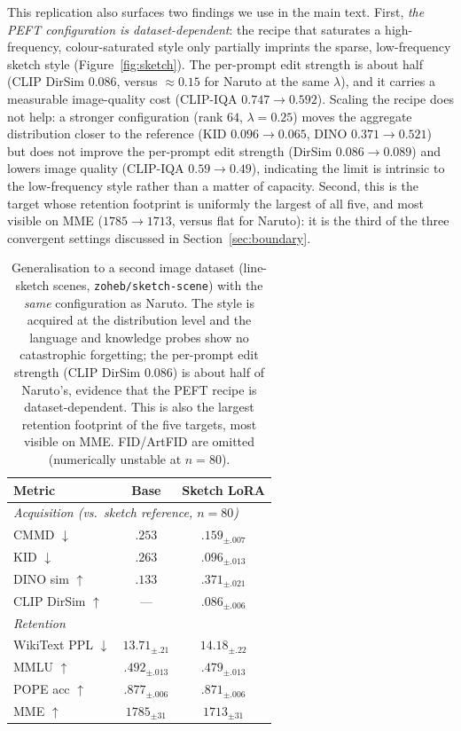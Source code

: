 This replication also surfaces two findings we use in the main text. First,
\emph{the PEFT configuration is dataset-dependent}: the recipe that saturates a
high-frequency, colour-saturated style only partially imprints the sparse,
low-frequency sketch style (Figure~\ref{fig:sketch}). The per-prompt edit
strength is about half (CLIP DirSim $0.086$, versus $\approx\!0.15$ for Naruto at
the same $\lambda$), and it carries a measurable image-quality cost (CLIP-IQA
$0.747\!\to\!0.592$). Scaling the recipe does not help: a stronger configuration
(rank $64$, $\lambda{=}0.25$) moves the aggregate distribution closer to the
reference (KID $0.096\!\to\!0.065$, DINO $0.371\!\to\!0.521$) but does not
improve the per-prompt edit strength (DirSim $0.086\!\to\!0.089$) and lowers
image quality (CLIP-IQA $0.59\!\to\!0.49$), indicating the limit is intrinsic to
the low-frequency style rather than a matter of capacity. Second, this is the
target whose retention footprint is uniformly the largest of all five, and most
visible on MME ($1785\!\to\!1713$, versus flat for Naruto): it is the third of
the three convergent settings discussed in Section~\ref{sec:boundary}.

\begin{table}[t]
\centering\small
\setlength{\tabcolsep}{8pt}
\begin{tabular}{lcc}
\toprule
Metric & Base & Sketch LoRA \\
\midrule
\multicolumn{3}{l}{\textit{Acquisition (vs.\ sketch reference, $n{=}80$)}}\\
CMMD $\downarrow$      & $.253$ & $\mathbf{.159}_{\pm.007}$ \\
KID $\downarrow$       & $.263$ & $\mathbf{.096}_{\pm.013}$ \\
DINO sim $\uparrow$    & $.133$ & $\mathbf{.371}_{\pm.021}$ \\
CLIP DirSim $\uparrow$ & ---    & $.086_{\pm.006}$ \\
\midrule
\multicolumn{3}{l}{\textit{Retention}}\\
WikiText PPL $\downarrow$ & $13.71_{\pm.21}$ & $14.18_{\pm.22}$ \\
MMLU $\uparrow$           & $.492_{\pm.013}$ & $.479_{\pm.013}$ \\
POPE acc $\uparrow$       & $.877_{\pm.006}$ & $.871_{\pm.006}$ \\
MME $\uparrow$            & $1785_{\pm31}$   & $1713_{\pm31}$ \\
\bottomrule
\end{tabular}
\caption{Generalisation to a second image dataset (line-sketch scenes,
\texttt{zoheb/sketch-scene}) with the \emph{same} configuration as Naruto. The
style is acquired at the distribution level and the language and knowledge probes
show no catastrophic forgetting; the per-prompt edit strength (CLIP DirSim
$0.086$) is about half of Naruto's, evidence that the PEFT recipe is
dataset-dependent. This is also the largest retention footprint of the five
targets, most visible on MME. FID/ArtFID are omitted (numerically unstable at
$n{=}80$).}
\label{tab:sketch}
\end{table}

